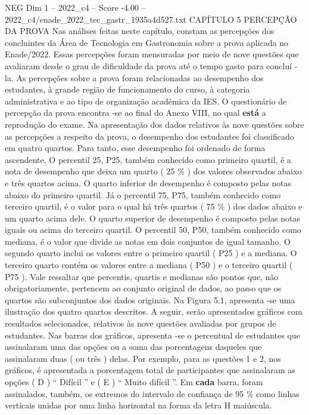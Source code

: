 \begin{textsample}{NEG Dim 1 – 2022\_c4 – Score -4.00 – 2022\_c4/enade\_2022\_tec\_gastr\_1935a4d527.txt}  \label{ex:f1_neg_174}
CAPÍTULO 5 PERCEPÇÃO DA PROVA Nas análises feitas neste capítulo, constam as percepções dos concluintes da Área de Tecnologia em Gastronomia sobre a prova aplicada no Enade/2022.
Essas percepções foram mensuradas por meio de nove questões que avaliaram desde o grau de dificuldade da prova até o tempo gasto para concluí -la.
As percepções sobre a prova foram relacionadas ao desempenho dos estudantes, à grande região de funcionamento do curso, à categoria administrativa e ao tipo de organização acadêmica da IES.
O questionário de percepção da prova encontra -se ao final do Anexo VIII, no qual \textbf{está} a reprodução do exame.
Na apresentação dos dados relativos às nove questões sobre as percepções a respeito da prova, o desempenho dos estudantes foi classificado em quatro quartos.
Para tanto, esse desempenho foi ordenado de forma ascendente.
O percentil 25, P25, também conhecido como primeiro quartil, é a nota de desempenho que deixa um quarto ( 25 \% ) dos valores observados abaixo e três quartos acima.
O quarto inferior de desempenho é composto pelas notas abaixo do primeiro quartil.
Já o percentil 75, P75, também conhecido como terceiro quartil, é o valor para o qual há três quartos ( 75 \% ) dos dados abaixo e um quarto acima dele.
O quarto superior de desempenho é composto pelas notas iguais ou acima do terceiro quartil.
O percentil 50, P50, também conhecido como mediana, é o valor que divide as notas em dois conjuntos de igual tamanho.
O segundo quarto inclui os valores entre o primeiro quartil ( P25 ) e a mediana.
O terceiro quarto contém os valores entre a mediana ( P50 ) e o terceiro quartil ( P75 ).
Vale ressaltar que percentis, quartis e medianas são pontos que, não obrigatoriamente, pertencem ao conjunto original de dados, ao passo que os quartos são subconjuntos dos dados originais.
Na Figura 5.1, apresenta -se uma ilustração dos quatro quartos descritos.
A seguir, serão apresentados gráficos com resultados selecionados, relativos às nove questões avaliadas por grupos de estudantes.
Nas barras dos gráficos, apresenta -se o percentual de estudantes que assinalaram uma das opções ou a soma das porcentagens daqueles que assinalaram duas ( ou três ) delas.
Por exemplo, para as questões 1 e 2, nos gráficos, é apresentada a porcentagem total de participantes que assinalaram as opções ( D ) “ Difícil ” e ( E ) “ Muito difícil ”.
Em \textbf{cada} barra, foram assinalados, também, os extremos do intervalo de confiança de 95 \% como linhas verticais unidas por uma linha horizontal na forma da letra H maiúscula.

\end{textsample}
